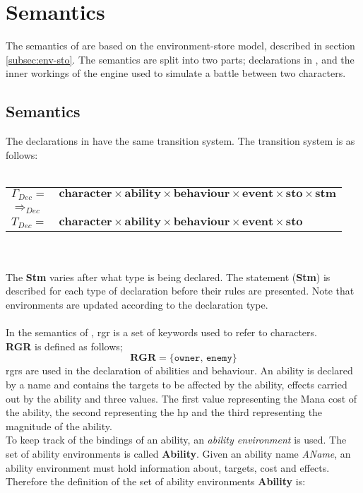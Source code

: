 \section{\langname{} Semantics}

The semantics of \langname{} are based on the environment-store model, described in section \ref{subsec:env-sto}.
The semantics are split into two parts; declarations in \langname{}, and the inner workings of the engine used to simulate a battle between two characters.
\subsection*{Semantics}
The declarations in \langname{} have the same transition system.
The transition system is as follows:\\\\
\begin{tabular}{l l}
$\Gamma_{Dec} = $ & $\mathbf{character \times ability \times behaviour \times event \times sto \times stm}$ \\
$\Rightarrow_{Dec}$ & \\
$T_{Dec} = $ & $\mathbf{character \times ability \times behaviour \times event \times sto}$ \\
\end{tabular}
\\\\
The \textbf{Stm} varies after what type is being declared. The statement (\textbf{Stm}) is described for each type of declaration before their rules are presented. Note that environments are updated according to the declaration type.
\\\\
In the semantics of \langname{}, \ac{rgr} is a set of keywords used to refer to characters.\\ \textbf{RGR} is defined as follows;  
%
$$\mathbf{RGR} = \{\texttt{owner, enemy\}}$$
%
\ac{rgrs} are used in the declaration of abilities and behaviour. An ability is declared by a name and contains the targets to be affected by the ability, effects carried out by the ability and three values. The first value representing the Mana cost of the ability, the second representing the \ac{hp} and the third representing the magnitude of the ability.\\
To keep track of the bindings of an ability, an \textit{ability environment} is used. The set of ability environments is called \textbf{Ability}. 
Given an ability name \textit{AName}, an ability environment must hold information about, targets, cost and effects. Therefore the definition of the set of ability environments \textbf{Ability} is:
